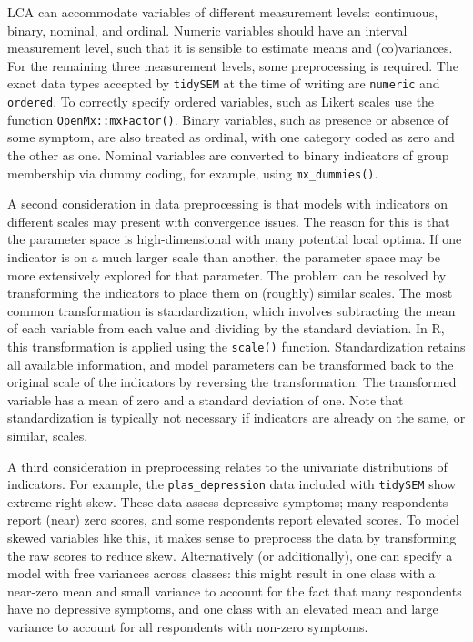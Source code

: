 \documentclass[
  ,man,floatsintext]{apa6}
\begin{document}
LCA can accommodate variables of different measurement levels: continuous, binary, nominal, and ordinal.
Numeric variables should have an interval measurement level,
such that it is sensible to estimate means and (co)variances.
For the remaining three measurement levels,
some preprocessing is required.
The exact data types accepted by \texttt{tidySEM} at the time of writing are \texttt{numeric} and \texttt{ordered}.
To correctly specify ordered variables,
such as Likert scales
use the function \texttt{OpenMx::mxFactor()}.
Binary variables,
such as presence or absence of some symptom, are also treated as ordinal, with one category coded as zero and the other as one.
Nominal variables are converted to binary indicators of group membership via dummy coding, for example, using \texttt{mx\_dummies()}.

A second consideration in data preprocessing is that models with indicators on different scales may present with convergence issues.
The reason for this is that the parameter space is high-dimensional with many potential local optima.
If one indicator is on a much larger scale than another, the parameter space may be more extensively explored for that parameter.
The problem can be resolved by transforming the indicators to place them on (roughly) similar scales.
The most common transformation is standardization, which involves subtracting the mean of each variable from each value and dividing by the standard deviation.
In R, this transformation is applied using the \texttt{scale()} function.
Standardization retains all available information,
and model parameters can be transformed back to the original scale of the indicators by reversing the transformation.
The transformed variable has a mean of zero and a standard deviation of one.
Note that standardization is typically not necessary if indicators are already on the same, or similar, scales.

A third consideration in preprocessing relates to the univariate distributions of indicators.
For example, the \texttt{plas\_depression} data included with \texttt{tidySEM} show extreme right skew.
These data assess depressive symptoms;
many respondents report (near) zero scores,
and some respondents report elevated scores.
To model skewed variables like this,
it makes sense to preprocess the data by transforming the raw scores to reduce skew.
Alternatively (or additionally), one can specify a model with free variances across classes:
this might result in one class with a near-zero mean and small variance to account for the fact that many respondents have no depressive symptoms,
and one class with an elevated mean and large variance to account for all respondents with non-zero symptoms.
\end{document}
